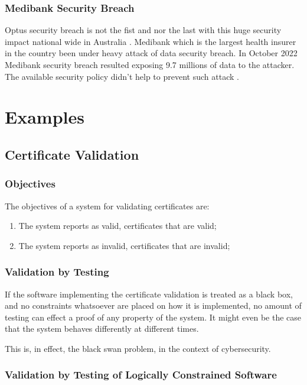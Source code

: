 \documentclass[journal]{IEEEtran}
\begin{document}
\subsubsection{Medibank Security Breach}
Optus security breach is not the fist and nor the last with this huge security impact national
wide in Australia \cite{medibank2022}\cite{maurice2023}. Medibank which is the largest health
insurer in the country been under heavy attack of data security breach. In October 2022 Medibank
security breach resulted exposing 9.7 millions of data to the attacker. The available security policy
didn't help to prevent such attack \cite{biddle2022p}.


\section{Examples}

\subsection{Certificate Validation}

\subsubsection{Objectives}

The objectives of a system for validating certificates are:
\begin{enumerate}[CO-1]
  \item\label{validates1} The system reports as valid, certificates that are valid;
  \item\label{validates2} The system reports as invalid, certificates that are invalid;
\end{enumerate}

\subsubsection{Validation by Testing}

If the software implementing the certificate validation is treated
as a black box, and no constraints whatsoever are placed on how it is
implemented, no amount of testing can effect a proof of any
property of the system. It might even be the case that the system
behaves differently at different times.

This is, in effect, the black swan problem, in the context of cybersecurity.

\subsubsection{Validation by Testing of Logically Constrained Software}
\end{document}
